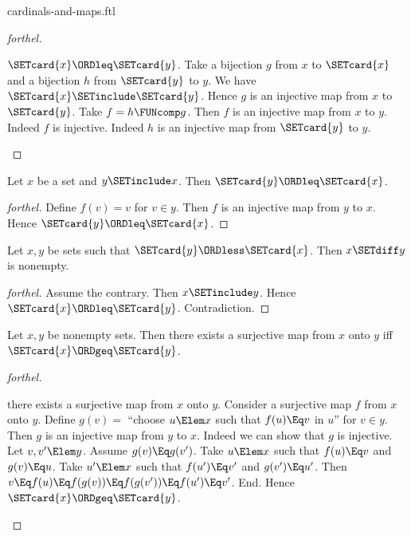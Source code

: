 \documentclass{stex}
\begin{document}
\begin{smodule}{cardinals-and-maps.ftl}
\begin{proof}[forthel]
  \begin{case}{$\SETcard{x} \ORDleq \SETcard{y}$.}
    Take a bijection $g$ from $x$ to $\SETcard{x}$ and a bijection $h$ from $\SETcard{y}$ to $y$.
    We have $\SETcard{x} \SETinclude \SETcard{y}$.
    Hence $g$ is an injective map from $x$ to $\SETcard{y}$.
    Take $f = h \FUNcomp g$.
    Then $f$ is an injective map from $x$ to $y$.
    Indeed $f$ is injective.
    Indeed $h$ is an injective map from $\SETcard{y}$ to $y$.
  \end{case}
\end{proof}

\begin{corollary}[forthel]
  Let $x$ be a set and $y \SETinclude x$.
  Then $\SETcard{y} \ORDleq \SETcard{x}$.
\end{corollary}
\begin{proof}[forthel]
  Define $f(v) = v$ for $v \in y$.
  Then $f$ is an injective map from $y$ to $x$.
  Hence $\SETcard{y} \ORDleq \SETcard{x}$.
\end{proof}

\begin{corollary}[forthel]
  Let $x, y$ be sets such that $\SETcard{y} \ORDless \SETcard{x}$.
  Then $x \SETdiff y$ is nonempty.
\end{corollary}
\begin{proof}[forthel]
  Assume the contrary.
  Then $x \SETinclude y$.
  Hence $\SETcard{x} \ORDleq \SETcard{y}$.
  Contradiction.
\end{proof}


\begin{proposition}[forthel,name=existence condition for surjections]
  Let $x, y$ be nonempty sets.
  Then there exists a surjective map from $x$ onto $y$ iff $\SETcard{x} \ORDgeq \SETcard{y}$.
\end{proposition}
\begin{proof}[forthel]
  \begin{case}{there exists a surjective map from $x$ onto $y$.}
    Consider a surjective map $f$ from $x$ onto $y$.
    Define $g(v) =$ ``choose $u \Elem x$ such that $f(u) \Eq v$ in $u$'' for $v \in y$.
    Then $g$ is an injective map from $y$ to $x$.
    Indeed we can show that $g$ is injective.
      Let $v, v' \Elem y$.
      Assume $g(v) \Eq g(v')$.
      Take $u \Elem x$ such that $f(u) \Eq v$ and $g(v) \Eq u$.
      Take $u' \Elem x$ such that $f(u') \Eq v'$ and $g(v') \Eq u'$.
      Then $v
        \Eq f(u)
        \Eq f(g(v))
        \Eq f(g(v'))
        \Eq f(u')
        \Eq v'$.
    End.
    Hence $\SETcard{x} \ORDgeq \SETcard{y}$.
  \end{case}


\end{proof}
\end{smodule}
\end{document}
